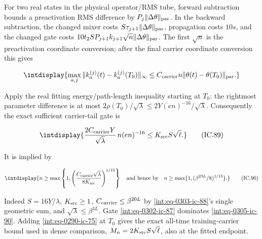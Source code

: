 
For two real states in the physical operator/RMS tube, forward subtraction bounds a preactivation RMS difference by \(P_j\|\Delta\theta\|_{\rm par}\). In the backward subtraction, the changed mixer costs \(S\tau_{j+1}\|\Delta\theta\|_{\rm par}\), propagation costs \(10s\), and the changed gate costs \(10t_2SP_{j+1}k_{j+1}\sqrt n\|\Delta\theta\|_{\rm par}\). The first \(\sqrt n\) is the preactivation coordinate conversion; after the final carrier coordinate conversion this gives


\begingroup\renewcommand{\theHequation}{intdisplay.687}
\begin{equation*}
\intdisplay{
\max_{a,j}\|k_a^{(j)}(t)-k_a^{(j)}(T_0)\|_\infty
 \le C_{\rm carrier} n\|\theta(t)-\theta(T_0)\|_{\rm par}.
}
\end{equation*}
\endgroup


Apply the real fitting energy/path-length inequality starting at \(T_0\): the rightmost parameter difference is at most \(2\rho(T_0)/\sqrt\lambda\le2Y(en)^{-16}/\sqrt\lambda\). Consequently the exact sufficient carrier-tail gate is


\begingroup\renewcommand{\theHequation}{intdisplay.688}
\begin{equation}
\intdisplay{
\frac{2C_{\rm carrier}Y}{\sqrt\lambda}\,n(en)^{-16}
                    \le K_{\rm src}S\sqrt\ell.
}
\tag{IC.89}
\label{int:eq-0304-ic-89}
\end{equation}
\endgroup


It is implied by


\begingroup\renewcommand{\theHequation}{intdisplay.689}
\begin{equation}
\intdisplay{
n\ge\max\left\{1,
 \left(\frac{C_{\rm carrier}\sqrt\lambda}{8K_{\rm src}}\right)^{1/15}
 \right\}
 \quad\text{and hence by}\quad
 n\ge\max\{1,(\beta^{23L}/8)^{1/15}\}.
}
\tag{IC.90}
\label{int:eq-0305-ic-90}
\end{equation}
\endgroup


Indeed \(S=16Y/\lambda\), \(K_{\rm src}\ge1\), \(C_{\rm carrier}\le\beta^{20L}\) by \eqref{int:eq-0303-ic-88}'s single geometric sum, and \(\sqrt\lambda\le\beta^{3L}\). Gate \eqref{int:eq-0302-ic-87} dominates \eqref{int:eq-0305-ic-90}. Adding \eqref{int:eq-0290-ic-75} at \(T_0\) gives the exact all-time training-carrier bound used in dense comparison, \(M_n=2K_{\rm src}S\sqrt\ell\), also at the fitted endpoint.


